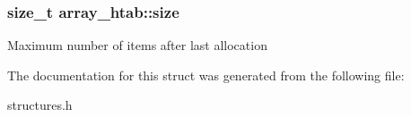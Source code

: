 \subsubsection[{size}]{\setlength{\rightskip}{0pt plus 5cm}size\+\_\+t array\+\_\+htab\+::size}\label{structarray__htab_a63abd88a74d355292833e33b5a6b1a72}
Maximum number of items after last allocation 

The documentation for this struct was generated from the following file\+:\begin{DoxyCompactItemize}
\item 
structures.\+h\end{DoxyCompactItemize}
